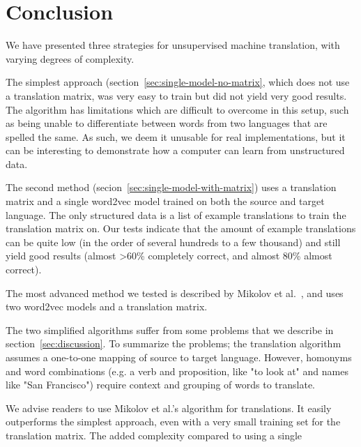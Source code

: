 \section{Conclusion}
We have presented three strategies for unsupervised machine translation, with varying degrees of complexity.

The simplest approach (section~\ref{sec:single-model-no-matrix}, which does not use a translation matrix, was very easy to train but did not yield very good results. The algorithm has limitations which are difficult to overcome in this setup, such as being unable to differentiate between words from two languages that are spelled the same. As such, we deem it unusable for real implementations, but it can be interesting to demonstrate how a computer can learn from unstructured data.

The second method (secion~\ref{sec:single-model-with-matrix}) uses a translation matrix and a single word2vec model trained on both the source and target language. The only structured data is a list of example translations to train the translation matrix on. Our tests indicate that the amount of example translations can be quite low (in the order of several hundreds to a few thousand) and still yield good results (almost >60\% completely correct, and almost 80\% almost correct).

The most advanced method we tested is described by Mikolov et al.~\cite{mikolov2013exploiting}, and uses two word2vec models and a translation matrix. 

The two simplified algorithms suffer from some problems that we describe in section~\ref{sec:discussion}. To summarize the problems; the translation algorithm assumes a one-to-one mapping of source to target language. However, homonyms and word combinations (e.g. a verb and proposition, like "to look at" and names like "San Francisco") require context and grouping of words to translate.

We advise readers to use Mikolov et al.'s algorithm for translations. It easily outperforms the simplest approach, even with a very small training set for the translation matrix. The added complexity compared to using a single 